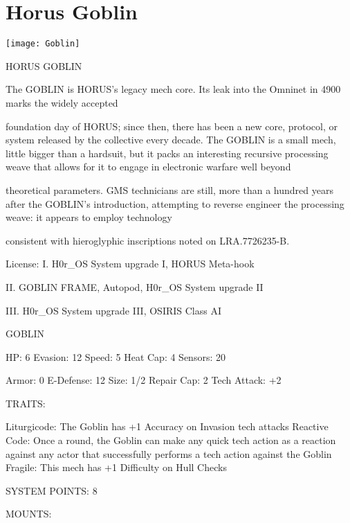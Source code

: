 \section{Horus Goblin}

\texttt{[image: Goblin]}

                                          HORUS GOBLIN

The GOBLIN is HORUS’s legacy mech core. Its leak into the Omninet in 4900 marks the widely accepted

foundation day of HORUS; since then, there has been a new core, protocol, or system released by the
collective every decade. The GOBLIN is a small mech, little bigger than a hardsuit, but it packs an
interesting recursive processing weave that allows for it to engage in electronic warfare well beyond

theoretical parameters. GMS technicians are still, more than a hundred years after the GOBLIN’s
introduction, attempting to reverse engineer the processing weave: it appears to employ technology

consistent with hieroglyphic inscriptions noted on LRA.7726235-B.

                                                  License:
I. H0r\_OS System upgrade I, HORUS Meta-hook

II. GOBLIN FRAME, Autopod, H0r\_OS System upgrade II

III. H0r\_OS System upgrade III, OSIRIS Class AI


                                                  GOBLIN

  HP: 6          Evasion: 12                          Speed: 5           Heat Cap: 4       Sensors: 20

  Armor: 0       E-Defense: 12                        Size: 1/2          Repair Cap: 2     Tech Attack:
                                                                                           +2

                                                   TRAITS:

  Liturgicode: The Goblin has +1 Accuracy on Invasion tech attacks
  Reactive Code: Once a round, the Goblin can make any quick tech action as a reaction against
  any actor that successfully performs a tech action against the Goblin
  Fragile: This mech has +1 Difficulty on Hull Checks

                                            SYSTEM POINTS: 8

                                                  MOUNTS:

